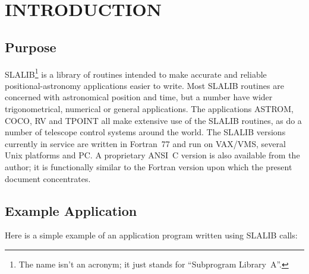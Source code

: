\documentclass[11pt,twoside,nolof]{starlink}
\begin{document}
\scfrontmatter

\section{INTRODUCTION}
\subsection{Purpose}
SLALIB\footnote{The name isn't an acronym;
it just stands for ``Subprogram Library~A''.}
is a library of routines
intended to make accurate and reliable positional-astronomy
applications easier to write.
Most SLALIB routines are concerned with astronomical position and time, but a
number have wider trigonometrical, numerical or general applications.
The applications ASTROM, COCO, RV and TPOINT
all make extensive use of the SLALIB
routines, as do a number of telescope control systems around the world.
The SLALIB versions currently in service are written in
Fortran~77 and run on VAX/VMS, several Unix platforms and PC.
A proprietary ANSI~C version is also available from the author;  it is
functionally similar to the Fortran version upon which the present
document concentrates.

\subsection{Example Application}
Here is a simple example of an application program written
using SLALIB calls:
\end{document}
